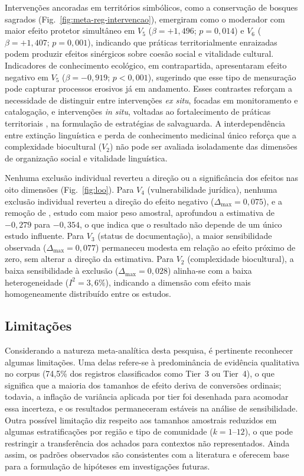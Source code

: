 \documentclass[12pt,a4paper]{article}
\begin{document}
Intervenções ancoradas em territórios simbólicos, como a conservação de bosques sagrados (Fig.~\ref{fig:meta-reg-intervencao}), emergiram como o moderador com maior efeito protetor simultâneo em $V_5$ ($\beta = +1{,}496$; $p = 0{,}014$) e $V_6$ ($\beta = +1{,}407$; $p = 0{,}001$), indicando que práticas territorialmente enraizadas podem produzir efeitos sinérgicos sobre coesão social e vitalidade cultural. Indicadores de conhecimento ecológico, em contrapartida, apresentaram efeito negativo em $V_5$ ($\beta = -0{,}919$; $p < 0{,}001$), sugerindo que esse tipo de mensuração pode capturar processos erosivos já em andamento. Esses contrastes reforçam a necessidade de distinguir entre intervenções \textit{ex situ}, focadas em monitoramento e catalogação, e intervenções \textit{in situ}, voltadas ao fortalecimento de práticas territoriais \citep{Zimmerer2018}, na formulação de estratégias de salvaguarda. A interdependência entre extinção linguística e perda de conhecimento medicinal único \citep{CamaraLeret2021} reforça que a complexidade biocultural ($V_2$) não pode ser avaliada isoladamente das dimensões de organização social e vitalidade linguística.

Nenhuma exclusão individual reverteu a direção ou a significância dos efeitos nas oito dimensões (Fig.~\ref{fig:loo}). Para $V_4$ (vulnerabilidade jurídica), nenhuma exclusão individual reverteu a direção do efeito negativo ($\Delta_{\max} = 0{,}075$), e a remoção de \citet{Sibanda2025}, estudo com maior peso amostral, aprofundou a estimativa de $-0{,}279$ para $-0{,}354$, o que indica que o resultado não depende de um único estudo influente. Para $V_3$ (status de documentação), a maior sensibilidade observada ($\Delta_{\max} = 0{,}077$) permaneceu modesta em relação ao efeito próximo de zero, sem alterar a direção da estimativa. Para $V_2$ (complexidade biocultural), a baixa sensibilidade à exclusão ($\Delta_{\max} = 0{,}028$) alinha-se com a baixa heterogeneidade ($I^2 = 3{,}6\%$), indicando a dimensão com efeito mais homogeneamente distribuído entre os estudos.

\subsection{Limitações}
\label{sec:limitations}

Considerando a natureza meta-analítica desta pesquisa, é pertinente reconhecer algumas limitações. Uma delas refere-se à predominância de evidência qualitativa no corpus (74,5\% dos registros classificados como Tier~3 ou Tier~4), o que significa que a maioria dos tamanhos de efeito deriva de conversões ordinais; todavia, a inflação de variância aplicada por tier foi desenhada para acomodar essa incerteza, e os resultados permaneceram estáveis na análise de sensibilidade. Outra possível limitação diz respeito aos tamanhos amostrais reduzidos em algumas estratificações por região e tipo de comunidade ($k = 1$--$12$), o que pode restringir a transferência dos achados para contextos não representados. Ainda assim, os padrões observados são consistentes com a literatura e oferecem base para a formulação de hipóteses em investigações futuras.
\end{document}
